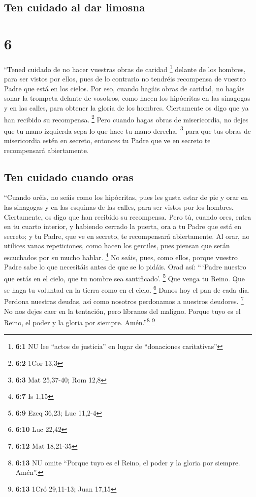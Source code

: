 \hypertarget{ten-cuidado-al-dar-limosna}{%
\subsection{Ten cuidado al dar
limosna}\label{ten-cuidado-al-dar-limosna}}

\hypertarget{section-5}{%
\section{6}\label{section-5}}

 ``Tened cuidado de no hacer vuestras obras de caridad
\footnote{\textbf{6:1} NU lee ``actos de justicia'' en lugar de
  ``donaciones caritativas''} delante de los hombres, para ser vistos
por ellos, pues de lo contrario no tendréis recompensa de vuestro Padre
que está en los cielos.  Por eso, cuando hagáis obras de
caridad, no hagáis sonar la trompeta delante de vosotros, como hacen los
hipócritas en las sinagogas y en las calles, para obtener la gloria de
los hombres. Ciertamente os digo que ya han recibido su recompensa.
\footnote{\textbf{6:2} 1Cor 13,3}  Pero cuando hagas obras
de misericordia, no dejes que tu mano izquierda sepa lo que hace tu mano
derecha, \footnote{\textbf{6:3} Mat 25,37-40; Rom 12,8} 
para que tus obras de misericordia estén en secreto, entonces tu Padre
que ve en secreto te recompensará abiertamente.

\hypertarget{ten-cuidado-cuando-oras}{%
\subsection{Ten cuidado cuando oras}\label{ten-cuidado-cuando-oras}}

 ``Cuando oréis, no seáis como los hipócritas, pues les
gusta estar de pie y orar en las sinagogas y en las esquinas de las
calles, para ser vistos por los hombres. Ciertamente, os digo que han
recibido su recompensa.  Pero tú, cuando ores, entra en tu
cuarto interior, y habiendo cerrado la puerta, ora a tu Padre que está
en secreto; y tu Padre, que ve en secreto, te recompensará abiertamente.
 Al orar, no utilices vanas repeticiones, como hacen los
gentiles, pues piensan que serán escuchados por su mucho hablar.
\footnote{\textbf{6:7} Is 1,15}  No seáis, pues, como
ellos, porque vuestro Padre sabe lo que necesitáis antes de que se lo
pidáis.  Orad así: ``\,`Padre nuestro que estás en el
cielo, que tu nombre sea santificado'. \footnote{\textbf{6:9} Ezeq
  36,23; Luc 11,2-4}  Que venga tu Reino. Que se haga tu
voluntad en la tierra como en el cielo. \footnote{\textbf{6:10} Luc
  22,42}  Danos hoy el pan de cada día. 
Perdona nuestras deudas, así como nosotros perdonamos a nuestros
deudores. \footnote{\textbf{6:12} Mat 18,21-35}  No nos
dejes caer en la tentación, pero líbranos del maligno. Porque tuyo es el
Reino, el poder y la gloria por siempre. Amén.''\footnote{\textbf{6:13}
  NU omite ``Porque tuyo es el Reino, el poder y la gloria por siempre.
  Amén''.} \footnote{\textbf{6:13} 1Cró 29,11-13; Juan 17,15}


